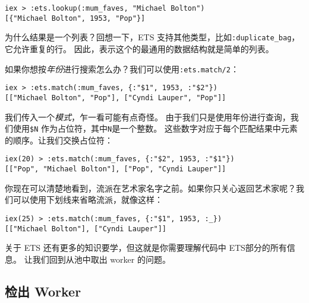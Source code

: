 \begin{code}{}\begin{verbatim}
iex > :ets.lookup(:mum_faves, "Michael Bolton")
[{"Michael Bolton", 1953, "Pop"}]
\end{verbatim}
\end{code}

为什么结果是一个列表？回想一下，ETS 支持其他类型，比如\texttt{:duplicate\_bag}，它允许重复的行。
因此，表示这个的最通用的数据结构就是简单的列表。

如果你想按\emph{年份}进行搜索怎么办？我们可以使用\texttt{:ets.match/2}：

\begin{code}{}\begin{verbatim}
iex > :ets.match(:mum_faves, {:"$1", 1953, :"$2"})
[["Michael Bolton", "Pop"], ["Cyndi Lauper", "Pop"]]
\end{verbatim}
\end{code}

我们传入一个\emph{模式}，乍一看可能有点奇怪。
由于我们只是使用年份进行查询，我们使用\texttt{\$N} 作为占位符，其中\texttt{N}是一个整数。
这些数字对应于每个匹配结果中元素的顺序。让我们交换占位符：

\begin{code}{}
\begin{verbatim}
iex(20) > :ets.match(:mum_faves, {:"$2", 1953, :"$1"})
[["Pop", "Michael Bolton"], ["Pop", "Cyndi Lauper"]]
\end{verbatim}
\end{code}

你现在可以清楚地看到，流派在艺术家名字之前。如果你只关心返回艺术家呢？我们可以使用下划线来省略流派，就像这样：

\begin{code}{}
\begin{verbatim}
iex(25) > :ets.match(:mum_faves, {:"$1", 1953, :_})
[["Michael Bolton"], ["Cyndi Lauper"]]
\end{verbatim}
\end{code}

关于 ETS 还有更多的知识要学，但这就是你需要理解代码中 ETS部分的所有信息。
让我们回到从池中取出 worker 的问题。

 \subsection{ 检出 Worker}

